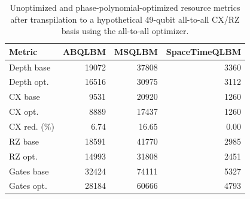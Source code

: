 \begin{table}[ht]
\centering
\begin{tabular}{lrrr}
\hline
Metric & ABQLBM & MSQLBM & SpaceTimeQLBM \\
\hline
Depth base & 19072 & 37808 & 3360 \\
Depth opt. & 16516 & 30975 & 3112 \\
CX base & 9531 & 20920 & 1260 \\
CX opt. & 8889 & 17437 & 1260 \\
CX red. (\%) & 6.74 & 16.65 & 0.00 \\
RZ base & 18591 & 41770 & 2985 \\
RZ opt. & 14993 & 31808 & 2451 \\
Gates base & 32424 & 74111 & 5327 \\
Gates opt. & 28184 & 60666 & 4793 \\
\hline
\end{tabular}
\caption{Unoptimized and phase-polynomial-optimized resource metrics after transpilation to a hypothetical 49-qubit all-to-all CX/RZ basis using the all-to-all optimizer.}
\label{tab:phase-poly-optimization-comparison-all-to-all}
\end{table}
